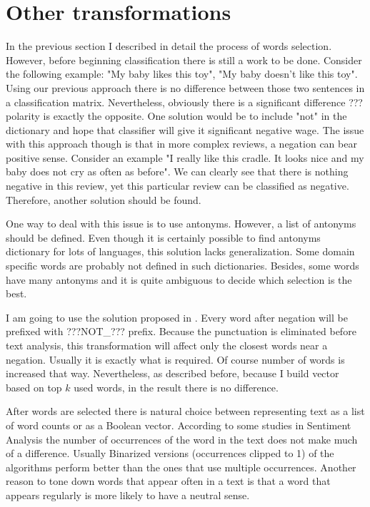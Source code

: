 \documentclass[12pt]{report}
\begin{document}
\newpage

\section{Other transformations}

In the previous section I described in detail the process of words selection.
However, before beginning classification there is still a work to be done. Consider the following example: "My baby likes this toy", "My baby doesn't like this toy". Using our previous approach there is no difference between those two sentences in a classification matrix. Nevertheless, obviously there is a significant difference ??? polarity is exactly the opposite. One solution would be to include "not" in the dictionary and hope that classifier will give it significant negative wage. The issue with this approach though is that in more complex reviews, a negation can bear positive sense. Consider an example "I really like this cradle. It looks nice and my baby does not cry as often as before". We can clearly see that there is nothing negative in this review, yet this particular review can be classified as negative. Therefore, another solution should be found.

One way to deal with this issue is to use antonyms. However, a list of antonyms should be defined. Even though it is certainly possible to find antonyms dictionary for lots of languages, this solution lacks generalization. Some domain specific words are probably not defined in such dictionaries. Besides, some words have many antonyms and it is quite ambiguous to decide which selection is the best.

I am going to use the solution proposed in \cite{Wake}. Every word after negation will be prefixed with ???NOT\_??? prefix. Because the punctuation is eliminated before text analysis, this transformation will affect only the closest words near a negation. Usually it is exactly what is required. Of course number of words is increased that way. Nevertheless, as described before, because I build vector based on top $k$ used words, in the result there is no difference.

After words are selected there is natural choice between representing text as a list of word counts or as a Boolean vector. According to some studies in Sentiment Analysis the number of occurrences of the word in the text does not make much of a difference. Usually Binarized versions (occurrences clipped to 1) of the algorithms perform better than the ones that use multiple occurrences.
Another reason to tone down words that appear often in a text is that a word that appears regularly is more likely to have a neutral sense.
\end{document}

